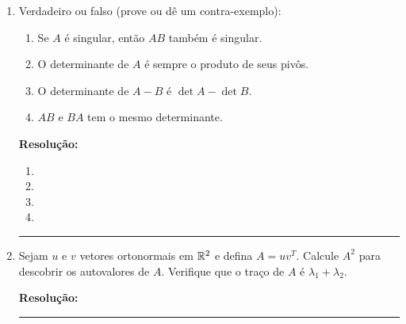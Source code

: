 \documentclass[leqno]{article}
\numberwithin{equation}{section}
\newenvironment{sol}
{
    \vspace{4mm}
    \noindent\textbf{Resolução:}
    \strut\newline
    \smallskip
    \hspace{-3.5mm}
}
{\noindent\rule{4cm}{.1mm}}
\begin{document}
\begin{enumerate}


\item Verdadeiro ou falso (prove ou dê um contra-exemplo):

\begin{enumerate}

\item Se $A$ é singular, então $AB$ também é singular.

\item O determinante de $A$ é sempre o produto de seus pivôs.

\item O determinante de $A - B$ é $\det A - \det B$.

\item $AB$ e $BA$ tem o mesmo determinante.

\end{enumerate}

\begin{sol} 
	\vspace{-\baselineskip} 
	\begin{enumerate} 
		\item %
		\item %
		\item %
		\item %
	\end{enumerate}    
\end{sol} 


\item Sejam $u$ e $v$ vetores ortonormais em $\mathbb{R}^2$ e defina $A = uv^T$. Calcule $A^2$ para descobrir os autovalores de $A$. Verifique que o traço de $A$ é $\lambda_1 + \lambda_2$.

\begin{sol} 
\end{sol} 



\end{enumerate}
\end{document}
